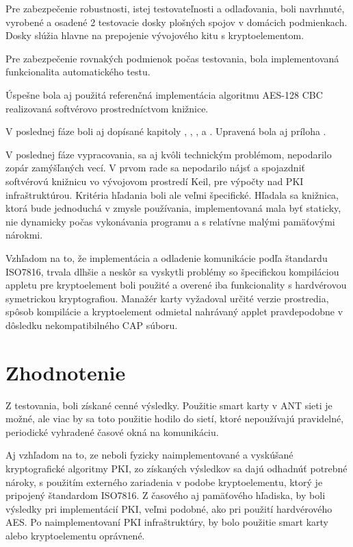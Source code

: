 \documentclass[12pt,a4paper,oneside,openright]{report}
\begin{document}
Pre zabezpečenie robustnosti, istej testovateľnosti a odlaďovania, boli navrhnuté, vyrobené a osadené 2 testovacie dosky plošných spojov v domácich podmienkach. Dosky slúžia hlavne na prepojenie vývojového kitu s kryptoelementom.

Pre zabezpečenie rovnakých podmienok počas testovania, bola implementovaná funkcionalita automatického testu.

Úspešne bola aj použitá referenčná implementácia algoritmu AES-128 CBC realizovaná softvérovo prostredníctvom knižnice.

V poslednej fáze boli aj dopísané kapitoly , , ,  a . Upravená bola aj príloha .

V poslednej fáze vypracovania, sa aj kvôli technickým problémom, nepodarilo zopár zamýšľaných vecí.
V prvom rade sa nepodarilo nájsť a spojazdniť softvérovú knižnicu vo vývojovom prostredí Keil, pre výpočty nad PKI infraštruktúrou. Kritéria hľadania boli ale veľmi špecifické. Hľadala sa knižnica, ktorá bude jednoduchá v zmysle používania, implementovaná mala byť  staticky, nie dynamicky počas vykonávania programu a s relatívne malými pamäťovými nárokmi.

Vzhľadom na to, že implementácia a odladenie komunikácie podľa štandardu ISO7816, trvala dlhšie a neskôr sa vyskytli problémy so špecifickou kompiláciou appletu pre kryptoelement  boli použité a overené iba funkcionality s hardvérovou symetrickou kryptografiou. Manažér karty vyžadoval určité verzie prostredia, spôsob kompilácie a kryptoelement odmietal nahrávaný applet pravdepodobne v dôsledku nekompatibilného CAP súboru.


\section{Zhodnotenie}

Z testovania, boli získané cenné výsledky. Použitie smart karty v ANT sieti je možné, ale viac by sa toto použitie hodilo do sietí, ktoré nepoužívajú pravidelné, periodické vyhradené časové okná na komunikáciu.

Aj vzhľadom na to, ze neboli fyzicky naimplementované a vyskúšané kryptografické algoritmy PKI, zo získaných výsledkov sa dajú odhadnúť potrebné nároky, s použitím externého zariadenia v podobe kryptoelementu, ktorý je pripojený štandardom ISO7816. Z časového aj pamäťového hľadiska, by boli výsledky pri implementácií PKI, veľmi podobné, ako pri použití hardvérového AES. Po naimplementovaní PKI infraštruktúry, by bolo použitie smart karty alebo kryptoelementu oprávnené. 
\end{document}
